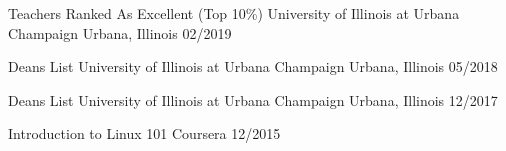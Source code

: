 \medskip
\begin{cvhonors}

\cvhonor
    {Teachers Ranked As Excellent (Top 10\%)} %
    {University of Illinois at Urbana Champaign} %
    {Urbana, Illinois} %
    {02/2019} %
    
\cvhonor
    {Deans List} %
    {University of Illinois at Urbana Champaign} %
    {Urbana, Illinois} %
    {05/2018} %
    
\cvhonor
    {Deans List} %
    {University of Illinois at Urbana Champaign} %
    {Urbana, Illinois} %
    {12/2017} %

\cvhonor
    {Introduction to Linux 101} %
    {Coursera} %
    {} %
    {12/2015} %

\end{cvhonors}

